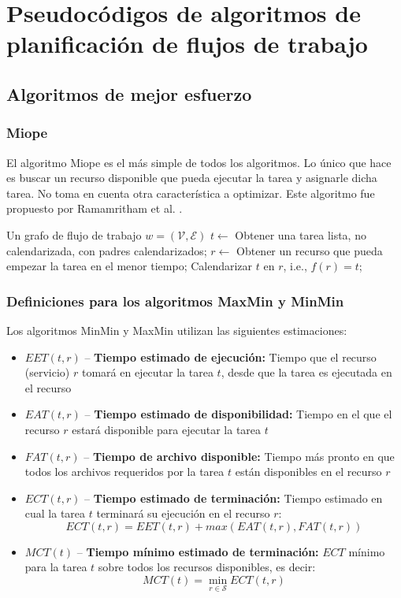 \chapter[Pseudocódigos]{Pseudocódigos de algoritmos de planificación de flujos de trabajo}

\section{Algoritmos de mejor esfuerzo}

\subsection{Miope}
El algoritmo Miope \cite{yu2008workflow} es el más simple de todos los algoritmos. Lo único que hace es buscar un recurso disponible que pueda ejecutar la tarea y asignarle dicha tarea. No toma en cuenta otra característica a optimizar. Este algoritmo fue propuesto por Ramamritham et al. \cite{ramamritham1990efficient}. 

\label{alg:myopic}
\begin{algorithmic}[1]
\Require Un grafo de flujo de trabajo $w=(\mathcal{V}, \mathcal{E})$
	\State $t \gets$ Obtener una tarea lista, no calendarizada, con padres calendarizados;
	\State $r \gets$ Obtener un recurso que pueda empezar la tarea en el menor tiempo;
	\State Calendarizar $t$ en $r$, i.e., $f(r) = t$;
\EndWhile
\end{algorithmic}

\subsection{Definiciones para los algoritmos MaxMin y MinMin}
\label{alg:def_maxmin}
Los algoritmos MinMin y MaxMin utilizan las siguientes estimaciones: %
\begin{itemize}
\item{$EET(t,r)$ -- \textbf{Tiempo estimado de ejecución:} Tiempo que el recurso (servicio) $r$ tomará en ejecutar la tarea $t$, desde que la tarea es ejecutada en el recurso}
\item{$EAT(t,r)$ -- \textbf{Tiempo estimado de disponibilidad:} Tiempo en el que el recurso $r$ estará disponible para ejecutar la tarea $t$}
\item{$FAT(t,r)$ -- \textbf{Tiempo de archivo disponible:} Tiempo más pronto en que todos los archivos requeridos por la tarea $t$ están disponibles en el recurso $r$}
\item{$ECT(t,r)$ -- \textbf{Tiempo estimado de terminación:} Tiempo estimado en cual la tarea $t$ terminará su ejecución en el recurso $r$: 
              \[ ECT(t,r) = EET(t,r) + max(EAT(t,r), FAT(t,r)) \]}
\item{$MCT(t)$ -- \textbf{Tiempo mínimo estimado de terminación: } $ECT$ mínimo para la tarea $t$ sobre todos los recursos disponibles, es decir: 
            \[ MCT(t) = \min_{r \in \mathcal{S}} ECT(t,r) \]}
\end{itemize}

